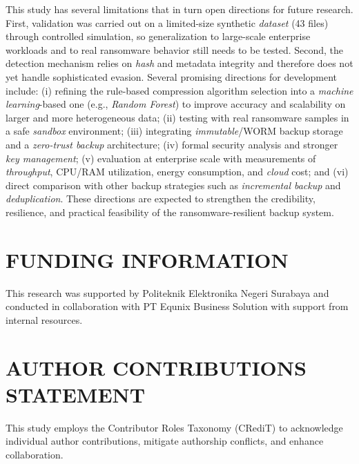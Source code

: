 \documentclass{iaesarticle}
\begin{document}
This study has several limitations that in turn open directions for future research. First, validation was carried out on a limited-size synthetic \textit{dataset} (43 files) through controlled simulation, so generalization to large-scale enterprise workloads and to real ransomware behavior still needs to be tested. Second, the detection mechanism relies on \textit{hash} and metadata integrity and therefore does not yet handle sophisticated evasion. Several promising directions for development include: (i) refining the rule-based compression algorithm selection into a \textit{machine learning}-based one (e.g., \textit{Random Forest}) to improve accuracy and scalability on larger and more heterogeneous data; (ii) testing with real ransomware samples in a safe \textit{sandbox} environment; (iii) integrating \textit{immutable}/WORM backup storage and a \textit{zero-trust backup} architecture; (iv) formal security analysis and stronger \textit{key management}; (v) evaluation at enterprise scale with measurements of \textit{throughput}, CPU/RAM utilization, energy consumption, and \textit{cloud} cost; and (vi) direct comparison with other backup strategies such as \textit{incremental backup} and \textit{deduplication}. These directions are expected to strengthen the credibility, resilience, and practical feasibility of the ransomware-resilient backup system.

\section*{FUNDING INFORMATION}
\label{sec:funding}
This research was supported by Politeknik Elektronika Negeri Surabaya and conducted in collaboration with PT Equnix Business Solution with support from internal resources.

\section*{AUTHOR CONTRIBUTIONS STATEMENT}
\label{sec:credit}
This study employs the Contributor Roles Taxonomy (CRediT) to acknowledge individual author contributions, mitigate authorship conflicts, and enhance collaboration.
\end{document}
